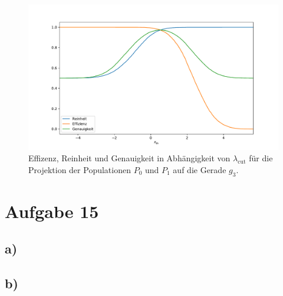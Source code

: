 \documentclass[a4paper, 11pt]{article}
\begin{document}
\begin{figure}[H]
  \centering
  \includegraphics[width=\textwidth]{../A13/A13c_2}
  \caption{Effizenz, Reinheit und Genauigkeit in Abhängigkeit von $\lambda_\text{cut}$
   für die Projektion der Populationen $P_0$ und $P_1$ auf die Gerade $g_3$.}
  \label{fig:effrein3}
\end{figure}

\FloatBarrier


\FloatBarrier
\section*{Aufgabe 15}
\subsection*{a) }

\subsection*{b) }
\end{document}
